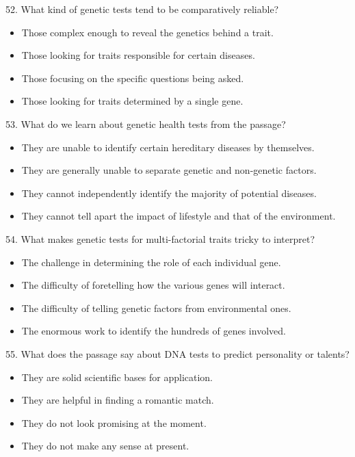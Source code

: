 \documentclass[UTF8,11pt]{ctexart}
\begin{document}
52. What kind of genetic tests tend to be comparatively reliable?


\begin{itemize}[leftmargin=2em,itemsep=.2em,topsep=.4em]\item[A.] Those complex enough to reveal the genetics behind a trait.
\item[B.] Those looking for traits responsible for certain diseases.
\item[C.] Those focusing on the specific questions being asked.
\item[D.] Those looking for traits determined by a single gene.
\end{itemize}

53. What do we learn about genetic health tests from the passage?


\begin{itemize}[leftmargin=2em,itemsep=.2em,topsep=.4em]\item[A.] They are unable to identify certain hereditary diseases by themselves.
\item[B.] They are generally unable to separate genetic and non-genetic factors.
\item[C.] They cannot independently identify the majority of potential diseases.
\item[D.] They cannot tell apart the impact of lifestyle and that of the environment.
\end{itemize}

54. What makes genetic tests for multi-factorial traits tricky to interpret?


\begin{itemize}[leftmargin=2em,itemsep=.2em,topsep=.4em]\item[A.] The challenge in determining the role of each individual gene.
\item[B.] The difficulty of foretelling how the various genes will interact.
\item[C.] The difficulty of telling genetic factors from environmental ones.
\item[D.] The enormous work to identify the hundreds of genes involved.
\end{itemize}

55. What does the passage say about DNA tests to predict personality or talents?


\begin{itemize}[leftmargin=2em,itemsep=.2em,topsep=.4em]\item[A.] They are solid scientific bases for application.
\item[B.] They are helpful in finding a romantic match.
\item[C.] They do not look promising at the moment.
\item[D.] They do not make any sense at present.
\end{itemize}
\end{document}
